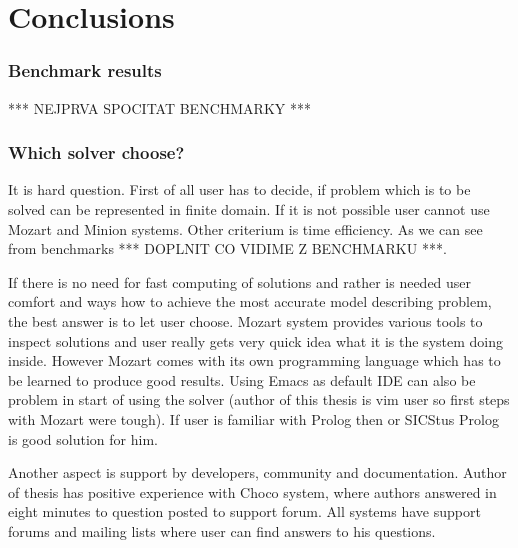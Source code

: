 \chapter{Conclusions}
\thispagestyle{myheadings}

\subsection{Benchmark results}

*** NEJPRVA SPOCITAT BENCHMARKY ***

\subsection{Which solver choose?}

It is hard question. First of all user has to decide, if problem which is to be 
solved can be represented in finite domain. If it is not possible user cannot use
Mozart and Minion systems. Other criterium is time efficiency. As we can see from
benchmarks *** DOPLNIT CO VIDIME Z BENCHMARKU ***.

If there is no need for fast computing of solutions and rather is needed user comfort
and ways how to achieve the most accurate model describing problem, the best answer
is to let user choose. Mozart system provides various tools to inspect solutions 
and user really gets very quick idea what it is the system doing inside. However Mozart comes
with its own programming language which has to be learned to produce good results.
Using Emacs as default IDE can also be problem in start of using the solver (author
of this thesis is vim user so first steps with Mozart were tough). If user is familiar
with Prolog then \eclipse or SICStus Prolog is good solution for him. 

Another aspect is support by developers, community and documentation. Author of 
thesis has positive experience with Choco system, where authors answered in eight 
minutes to question posted to support forum. All systems have support forums and 
mailing lists where user can find answers to his questions.      
